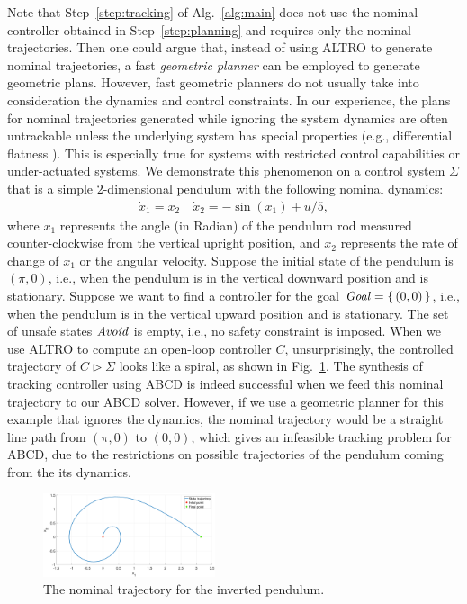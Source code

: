Note that Step~\ref{step:tracking} of Alg.~\ref{alg:main} does not use the nominal controller obtained in Step~\ref{step:planning} and requires only the nominal trajectories.
Then one could argue that, instead of using ALTRO to generate nominal trajectories, a fast \emph{geometric planner} \cite{Kavraki1996rrt} can be employed to generate geometric plans.
However, fast geometric planners do not usually take into consideration the dynamics and control constraints. In our experience, the plans for nominal trajectories generated while ignoring the system dynamics are often untrackable unless the underlying system has special properties (e.g., differential flatness \cite{Murray95differentialflatness}).
This is especially true for systems with restricted control capabilities or under-actuated systems.
We demonstrate this phenomenon on a control system $\Sigma$ that is a simple $2$-dimensional pendulum with the following nominal dynamics:
	\begin{align*}
		\dot{x}_1 = x_2\quad
		\dot{x}_2 = -\sin(x_1) + u/5,
	\end{align*}
where $x_1$ represents the angle (in Radian) of the pendulum rod measured counter-clockwise from the vertical upright position, and $x_2$ represents the rate of change of $x_1$ or the angular velocity.
Suppose the initial state of the pendulum is $(\pi,0)$, i.e., when the pendulum is in the vertical downward position and is stationary.
Suppose we want to find a controller for the goal $\mathit{Goal} = \set{(0,0)}$, i.e., when the pendulum is in the vertical upward position and is stationary.
The set of unsafe states $\mathit{Avoid}$ is empty, i.e., no safety constraint is imposed.
When we use ALTRO to compute an open-loop controller $C$, unsurprisingly, the controlled trajectory of $C\triangleright \Sigma$ looks like a spiral, as shown in Fig.~\ref{fig:traj 2d pendulum}.
The synthesis of tracking controller using ABCD is indeed successful when we feed this nominal trajectory to our ABCD solver.
However, if we use a geometric planner for this example that ignores the dynamics, the nominal trajectory would be a straight line path from $(\pi,0)$ to $(0,0)$, which gives an infeasible tracking problem for ABCD, due to the restrictions on possible trajectories of the pendulum coming from the its dynamics.
	\begin{figure}
		\includegraphics[width=0.45\textwidth]{figures/inverted_pendulum_plot2.eps}
		\caption{The nominal trajectory for the inverted pendulum.} %
		\label{fig:traj 2d pendulum}
	\end{figure}
